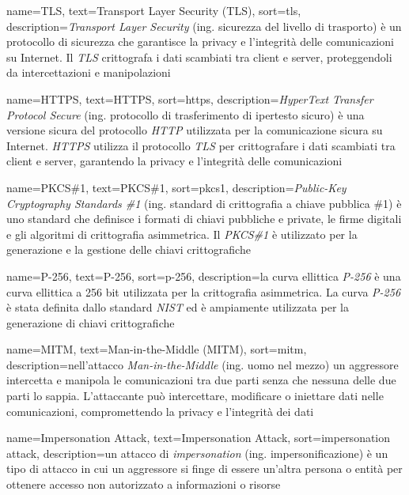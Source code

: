  {
    name=TLS,
    text=Transport Layer Security (TLS),
    sort=tls,
    description={\emph{Transport Layer Security} (ing. sicurezza del livello di trasporto) è un protocollo di sicurezza che garantisce la privacy e l'integrità delle comunicazioni su Internet. Il \emph{TLS} crittografa i dati scambiati tra client e server, proteggendoli da intercettazioni e manipolazioni}
}

 {
    name=HTTPS,
    text=HTTPS,
    sort=https,
    description={\emph{HyperText Transfer Protocol Secure} (ing. protocollo di trasferimento di ipertesto sicuro) è una versione sicura del protocollo \emph{HTTP} utilizzata per la comunicazione sicura su Internet. \emph{HTTPS} utilizza il protocollo \emph{TLS} per crittografare i dati scambiati tra client e server, garantendo la privacy e l'integrità delle comunicazioni}
}

 {
    name=PKCS\#1,
    text=PKCS\#1,
    sort=pkcs1,
    description={\emph{Public-Key Cryptography Standards \#1} (ing. standard di crittografia a chiave pubblica \#1) è uno standard che definisce i formati di chiavi pubbliche e private, le firme digitali e gli algoritmi di crittografia asimmetrica. Il \emph{PKCS\#1} è utilizzato per la generazione e la gestione delle chiavi crittografiche}
}

 {
    name=P-256,
    text=P-256,
    sort=p-256,
    description={la curva ellittica \emph{P-256} è una curva ellittica a 256 bit utilizzata per la crittografia asimmetrica. La curva \emph{P-256} è stata definita dallo standard \emph{NIST} ed è ampiamente utilizzata per la generazione di chiavi crittografiche}
}

 {
    name=MITM,
    text=Man-in-the-Middle (MITM),
    sort=mitm,
    description={nell'attacco \emph{Man-in-the-Middle} (ing. uomo nel mezzo) un aggressore intercetta e manipola le comunicazioni tra due parti senza che nessuna delle due parti lo sappia. L'attaccante può intercettare, modificare o iniettare dati nelle comunicazioni, compromettendo la privacy e l'integrità dei dati}
}

 {
    name=Impersonation Attack,
    text=Impersonation Attack,
    sort=impersonation attack,
    description={un attacco di \emph{impersonation} (ing. impersonificazione) è un tipo di attacco in cui un aggressore si finge di essere un'altra persona o entità per ottenere accesso non autorizzato a informazioni o risorse}
}